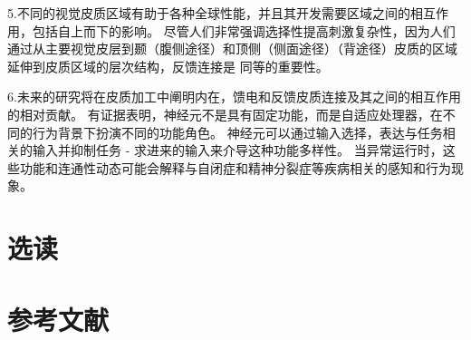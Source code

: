 5.不同的视觉皮质区域有助于各种全球性能，并且其开发需要区域之间的相互作用，包括自上而下的影响。 尽管人们非常强调选择性提高刺激复杂性，因为人们通过从主要视觉皮层到颞（腹侧途径）和顶侧（侧面途径）（背途径）皮质的区域延伸到皮质区域的层次结构，反馈连接是 同等的重要性。 

6.未来的研究将在皮质加工中阐明内在，馈电和反馈皮质连接及其之间的相互作用的相对贡献。 有证据表明，神经元不是具有固定功能，而是自适应处理器，在不同的行为背景下扮演不同的功能角色。 神经元可以通过输入选择，表达与任务相关的输入并抑制任务 - 求进来的输入来介导这种功能多样性。 当异常运行时，这些功能和连通性动态可能会解释与自闭症和精神分裂症等疾病相关的感知和行为现象。

\section{选读}
\section{参考文献}